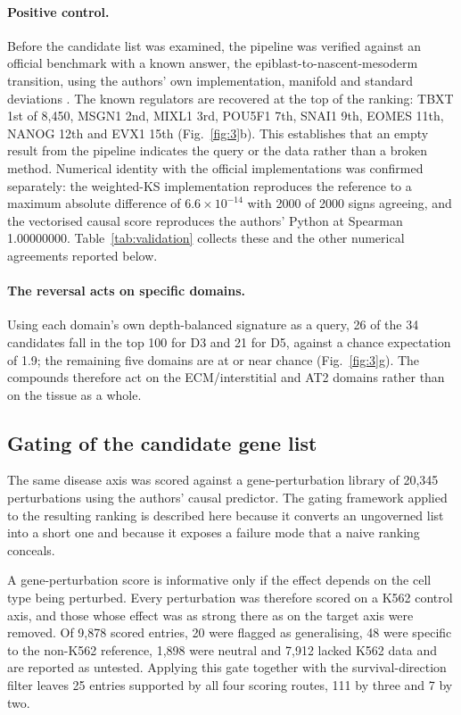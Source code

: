 \paragraph{Positive control.} Before the candidate list was examined, the pipeline was
verified against an official benchmark with a known answer, the epiblast-to-nascent-mesoderm
transition, using the authors' own implementation, manifold and standard deviations
\citep{pan2026scmg}. The known regulators are recovered at the top of the ranking: TBXT 1st
of 8,450, MSGN1 2nd, MIXL1 3rd, POU5F1 7th, SNAI1 9th, EOMES 11th, NANOG 12th and EVX1 15th
(Fig.~\ref{fig:3}b). This establishes that an empty result from the pipeline indicates the
query or the data rather than a broken method. Numerical identity with the official
implementations was confirmed separately: the weighted-KS implementation reproduces the
reference to a maximum absolute difference of $6.6\times10^{-14}$ with 2000 of 2000 signs
agreeing, and the vectorised causal score reproduces the authors' Python at Spearman
1.00000000. Table~\ref{tab:validation} collects these and the other numerical agreements
reported below.

\paragraph{The reversal acts on specific domains.} Using each domain's own depth-balanced
signature as a query, 26 of the 34 candidates fall in the top 100 for D3 and 21 for D5,
against a chance expectation of 1.9; the remaining five domains are at or near chance
(Fig.~\ref{fig:3}g). The compounds therefore act on the ECM/interstitial and AT2 domains
rather than on the tissue as a whole.



\subsection{Gating of the candidate gene list}

The same disease axis was scored against a gene-perturbation library of 20,345 perturbations
\citep{pan2026scmg} using the authors' causal predictor. The gating framework applied to the
resulting ranking is described here because it converts an ungoverned list into a short one
and because it exposes a failure mode that a naive ranking conceals.

A gene-perturbation score is informative only if the effect depends on the cell type being
perturbed. Every perturbation was therefore scored on a K562 control axis, and those whose
effect was as strong there as on the target axis were removed. Of 9,878 scored entries, 20
were flagged as generalising, 48 were specific to the non-K562 reference, 1,898 were neutral
and 7,912 lacked K562 data and are reported as untested. Applying this gate together with
the survival-direction filter leaves 25 entries supported by all four scoring routes, 111 by
three and 7 by two.

